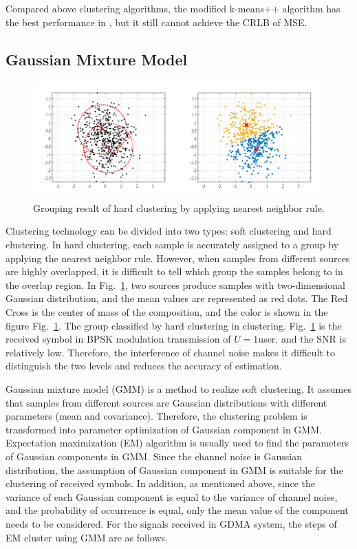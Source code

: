 Compared above clustering algorithms, the modified k-means++ algorithm has the best performance in \cite{hsu2020uplink}, but it still cannot achieve the CRLB of MSE.  


\subsection{Gaussian Mixture Model}

\begin{figure}[b!]
 \centering
 \includegraphics[width=15cm]{fig/hard_clustering.png}
 \caption{Grouping result of hard clustering by applying nearest neighbor rule.}
 \label{fig:hard_clustering}
\end{figure}

Clustering technology can be divided into two types: soft clustering and hard clustering. In hard clustering, each sample is accurately assigned to a group by applying the nearest neighbor rule. However, when samples from different sources are highly overlapped, it is difficult to tell which group the samples belong to in the overlap region.  In Fig.~\ref{fig:hard_clustering}, two sources produce samples with two-dimensional Gaussian distribution, and the mean values are represented as red dots. The Red Cross is the center of mass of the composition, and the color is shown in the figure Fig.~\ref{fig:hard_clustering}. The group classified by hard clustering in clustering.  Fig.~\ref{fig:hard_clustering} is the received symbol in BPSK modulation transmission of $U = 1 $user, and the SNR is relatively low. Therefore, the interference of channel noise makes it difficult to distinguish the two levels and reduces the accuracy of 
estimation.

Gaussian mixture model (GMM) is a method to realize soft clustering. It assumes that samples from different sources are Gaussian distributions with different parameters (mean and covariance). Therefore, the clustering problem is transformed into parameter optimization of Gaussian component in GMM. Expectation maximization (EM) algorithm \cite{em77} is usually used to find the parameters of Gaussian components in GMM. Since the channel noise is Gaussian distribution, the assumption of Gaussian component in GMM is suitable for the clustering of received symbols. In addition, as mentioned above, since the variance of each Gaussian component is equal to the variance of channel noise, and the probability of occurrence is equal, only the mean value of the component needs to be considered. For the signals received in GDMA system, the steps of EM cluster using GMM are as follows.

